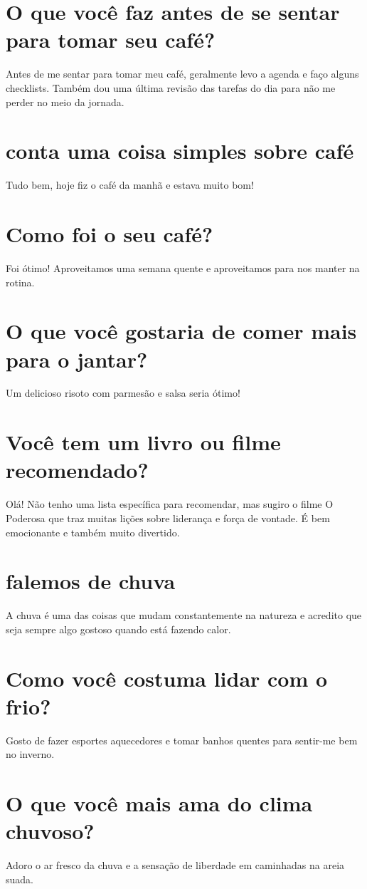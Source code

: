 \documentclass[11pt,a4paper]{article}
\begin{document}
\section{O que você faz antes de se sentar para tomar seu café?}
Antes de me sentar para tomar meu café, geralmente levo a agenda e faço alguns checklists. Também dou uma última revisão das tarefas do dia para não me perder no meio da jornada.

\section{conta uma coisa simples sobre café}
Tudo bem, hoje fiz o café da manhã e estava muito bom!

\section{Como foi o seu café?}
Foi ótimo! Aproveitamos uma semana quente e aproveitamos para nos manter na rotina.

\section{O que você gostaria de comer mais para o jantar?}
Um delicioso risoto com parmesão e salsa seria ótimo!

\section{Você tem um livro ou filme recomendado?}
Olá! Não tenho uma lista específica para recomendar, mas sugiro o filme O Poderosa que traz muitas lições sobre liderança e força de vontade. É bem emocionante e também muito divertido.

\section{falemos de chuva}
A chuva é uma das coisas que mudam constantemente na natureza e acredito que seja sempre algo gostoso quando está fazendo calor.

\section{Como você costuma lidar com o frio?}
Gosto de fazer esportes aquecedores e tomar banhos quentes para sentir-me bem no inverno.

\section{O que você mais ama do clima chuvoso?}
Adoro o ar fresco da chuva e a sensação de liberdade em caminhadas na areia suada.
\end{document}
